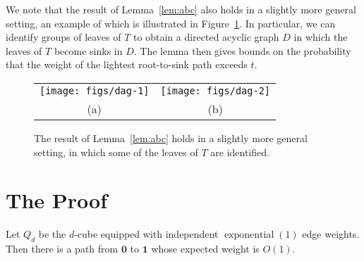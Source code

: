 \documentclass[a4paper,UKenglish]{lipics-v2016}
\DeclareMathOperator{\exponential}{exponential}
\newcommand{\zero}{\mathbf{0}}
\newcommand{\one}{\mathbf{1}}
\begin{document}
\begin{remark}
We note that the result of Lemma~\ref{lem:abc} also holds in
a slightly more general setting, an example of which is illustrated in
Figure~\ref{fig:dag}. In particular, we can identify groups
of leaves of $T$ to obtain a directed acyclic graph $D$ in which the
leaves of $T$ become sinks in $D$. The lemma then gives bounds on the
probability that the weight of the lightest root-to-sink path exceeds $t$.
\end{remark}

\begin{figure}
   \begin{center}
     \begin{tabular}{cc}
       \texttt{[image: figs/dag-1]} & \texttt{[image: figs/dag-2]} \\
       (a) & (b)
     \end{tabular}
   \end{center}
  \caption{The result of Lemma~\ref{lem:abc} holds in a slightly more general setting, in which some of the leaves of $T$ are identified.}
  \label{fig:dag}
\end{figure}

\section{The Proof}


\begin{theorem}
  Let $Q_d$ be the $d$-cube equipped with independent $\exponential(1)$
  edge weights.  Then there is a path from $\zero$ to $\one$ whose
  expected weight is $O(1)$.
\end{theorem}
\end{document}
